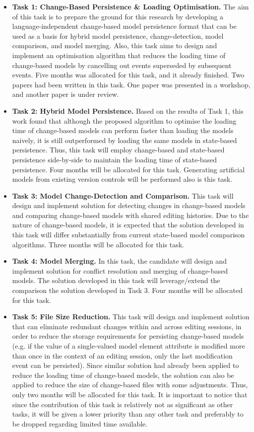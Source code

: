 \documentclass[12pt, a4paper]{report} \usepackage[titletoc]{appendix}
\begin{document}
\begin{itemize}
    \item \textbf{Task 1: Change-Based Persistence \& Loading Optimisation.}  The aim of this task is to prepare the ground for this research by developing a language-independent change-based model persistence format that can be used as a basis for hybrid model persistence, change-detection, model comparison, and model merging. Also, this task aims to design and implement an optimisation algorithm that reduces the loading time of change-based models by cancelling out events superseded by subsequent events. Five months was allocated for this task, and it already finished. Two papers had been written in this task. One paper was presented in a workshop, and another paper is under review. 
    \item \textbf{Task 2: Hybrid Model Persistence.} Based on the results of Task 1, this work found that although the proposed algorithm to optimise the loading time of change-based models can perform faster than loading the models naively, it is still outperformed by loading the same models in state-based persistence. Thus, this task will employ change-based and state-based persistence side-by-side to maintain the loading time of state-based persistence. Four months will be allocated for this task. Generating artificial models from existing version controls will be performed also is this task.  
    \item \textbf{Task 3: Model Change-Detection and Comparison.} This task will design and implement solution for detecting changes in change-based models and comparing change-based models with shared editing histories. Due to the nature of change-based models, it is expected that the solution developed in this task will differ substantially from current state-based model comparison algorithms. Three months will be allocated for this task. 
    \item \textbf{Task 4: Model Merging.} In this task, the candidate will design and implement solution for conflict resolution and merging of change-based models. The solution developed in this task will leverage/extend the comparison the solution developed in Task 3. Four months will be allocated for this task. 
    \item \textbf{Task 5: File Size Reduction.} This task will design and implement solution that can eliminate redundant changes within and across editing sessions, in order to reduce the storage requirements for persisting change-based models (e.g. if the value of a single-valued model element attribute is modified more than once in the context of an editing session, only the last modification event can be persisted). Since similar solution had already been applied to reduce the loading time of change-based models, the solution can also be applied to reduce the size of change-based files with some adjustments. Thus, only two months will be allocated for this task. It is important to notice that since the contribution of this task is relatively not as significant as other tasks, it will be given a lower priority than any other task and preferably to be dropped regarding limited time available.

\end{itemize}
\end{document}

